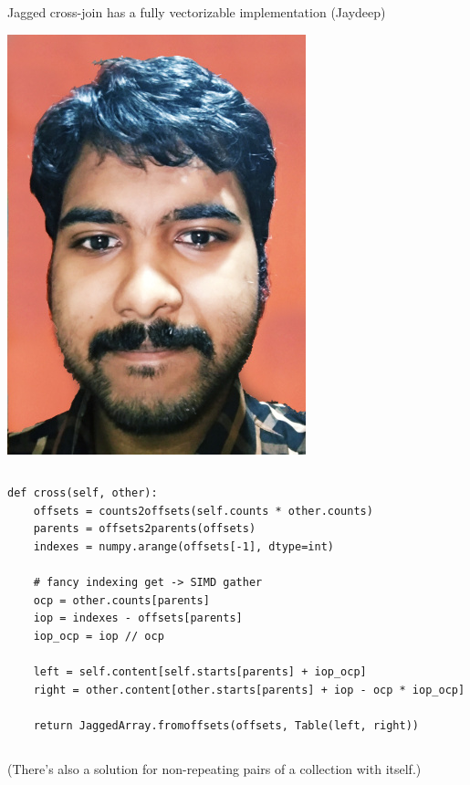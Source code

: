 \documentclass[aspectratio=169]{beamer}
\begin{document}
\begin{frame}[fragile]{Jagged cross-join has a fully vectorizable implementation (Jaydeep)}
\small
\vspace{0.2 cm}

\hfill \mbox{\includegraphics[height=2.5 cm]{jaydeep.jpg}\hspace{-0.75 cm}}

\vspace{-2.7 cm}
\begin{columns}
\begin{verbatim}
def cross(self, other):
    offsets = counts2offsets(self.counts * other.counts)
    parents = offsets2parents(offsets)
    indexes = numpy.arange(offsets[-1], dtype=int)

    # fancy indexing get -> SIMD gather
    ocp = other.counts[parents]
    iop = indexes - offsets[parents]
    iop_ocp = iop // ocp

    left = self.content[self.starts[parents] + iop_ocp]
    right = other.content[other.starts[parents] + iop - ocp * iop_ocp]

    return JaggedArray.fromoffsets(offsets, Table(left, right))
\end{verbatim}
\end{columns}

\normalsize
\vspace{0.5 cm}
(There's also a solution for non-repeating pairs of a collection with itself.)
\end{frame}
\end{document}
